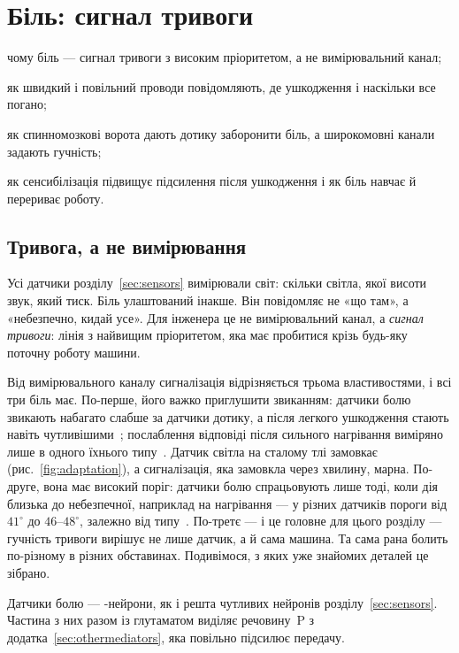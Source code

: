 \chapter{Біль: сигнал тривоги}
\label{sec:pain}
\begin{chaptergoals}
\item чому біль --- сигнал тривоги з високим пріоритетом, а не вимірювальний канал;
\item як швидкий і повільний проводи повідомляють, де ушкодження і наскільки все погано;
\item як спинномозкові ворота дають дотику заборонити біль, а широкомовні канали задають гучність;
\item як сенсибілізація підвищує підсилення після ушкодження і як біль навчає й перериває роботу.
\end{chaptergoals}

\section{Тривога, а не вимірювання}

Усі датчики розділу~\ref{sec:sensors} вимірювали світ: скільки світла, якої висоти звук, який тиск. Біль улаштований інакше. Він повідомляє не «що там», а «небезпечно, кидай усе». Для інженера це не вимірювальний канал, а \emph{сигнал тривоги}: лінія з найвищим пріоритетом, яка має пробитися крізь будь-яку поточну роботу машини.

Від вимірювального каналу сигналізація відрізняється трьома властивостями, і всі три біль має. По-перше, його важко приглушити звиканням: датчики болю звикають набагато слабше за датчики дотику, а після легкого ушкодження стають навіть чутливішими~\cite{LaMotte1982hyper}; послаблення відповіді після сильного нагрівання виміряно лише в одного їхнього типу~\cite{Treede1995heat}. Датчик світла на сталому тлі замовкає (рис.~\ref{fig:adaptation}), а сигналізація, яка замовкла через хвилину, марна. По-друге, вона має високий поріг: датчики болю спрацьовують лише тоді, коли дія близька до небезпечної, наприклад на нагрівання --- у різних датчиків пороги від $41^\circ$ до $46$--$48^\circ$, залежно від типу~\cite{Treede1995heat, Weidner1999cfib}. По-третє --- і це головне для цього розділу --- гучність тривоги вирішує не лише датчик, а й сама машина. Та сама рана болить по-різному в різних обставинах. Подивімося, з яких уже знайомих деталей це зібрано.

Датчики болю --- -нейрони, як і решта чутливих нейронів розділу~\ref{sec:sensors}. Частина з них разом із глутаматом виділяє речовину~P з додатка~\ref{sec:othermediators}, яка повільно підсилює передачу.

